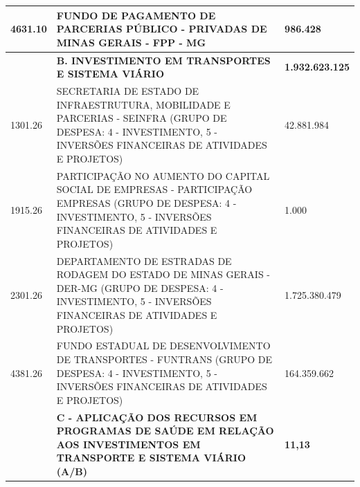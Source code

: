 \documentclass{article}
\begin{document}
\begin{longtable}[c]{m{3cm}|m{12cm}|m{3cm}}
\multicolumn{1}{C{3cm}|}{4631.10} & \multicolumn{1}{L{12cm}|}{FUNDO DE PAGAMENTO DE PARCERIAS PÚBLICO - PRIVADAS DE MINAS GERAIS - FPP - MG} & \multicolumn{1}{R{3cm}}{986.428} \\
\hline
\multicolumn{1}{C{3cm}|}{ \textbf{}} & \multicolumn{1}{L{12cm}|}{ \textbf{B. INVESTIMENTO EM TRANSPORTES E SISTEMA VIÁRIO}} & \multicolumn{1}{R{3cm}}{ \textbf{1.932.623.125}} \\
\multicolumn{1}{C{3cm}|}{1301.26} & \multicolumn{1}{L{12cm}|}{SECRETARIA DE ESTADO DE INFRAESTRUTURA, MOBILIDADE E PARCERIAS - SEINFRA (GRUPO DE DESPESA: 4 - INVESTIMENTO, 5 - INVERSÕES FINANCEIRAS DE ATIVIDADES E PROJETOS)} & \multicolumn{1}{R{3cm}}{42.881.984} \\
\multicolumn{1}{C{3cm}|}{1915.26} & \multicolumn{1}{L{12cm}|}{PARTICIPAÇÃO NO AUMENTO DO CAPITAL SOCIAL DE EMPRESAS - PARTICIPAÇÃO EMPRESAS (GRUPO DE DESPESA: 4 - INVESTIMENTO, 5 - INVERSÕES FINANCEIRAS DE ATIVIDADES E PROJETOS)} & \multicolumn{1}{R{3cm}}{1.000} \\
\multicolumn{1}{C{3cm}|}{2301.26} & \multicolumn{1}{L{12cm}|}{DEPARTAMENTO DE ESTRADAS DE RODAGEM DO ESTADO DE MINAS GERAIS - DER-MG (GRUPO DE DESPESA: 4 - INVESTIMENTO, 5 - INVERSÕES FINANCEIRAS DE ATIVIDADES E PROJETOS)} & \multicolumn{1}{R{3cm}}{1.725.380.479} \\
\multicolumn{1}{C{3cm}|}{4381.26} & \multicolumn{1}{L{12cm}|}{FUNDO ESTADUAL DE DESENVOLVIMENTO DE TRANSPORTES - FUNTRANS (GRUPO DE DESPESA: 4 - INVESTIMENTO, 5 - INVERSÕES FINANCEIRAS DE ATIVIDADES E PROJETOS)} & \multicolumn{1}{R{3cm}}{164.359.662} \\
\hline
\multicolumn{1}{C{3cm}|}{ \textbf{}} & \multicolumn{1}{L{12cm}|}{ \textbf{C - APLICAÇÃO DOS RECURSOS EM PROGRAMAS DE SAÚDE EM RELAÇÃO AOS INVESTIMENTOS EM TRANSPORTE E SISTEMA VIÁRIO (A/B)}} & \multicolumn{1}{R{3cm}}{ \textbf{11,13}} \\\hline\hline\end{longtable}\raggedright\fontsize{7pt}{10pt}\selectfont {Fonte: PPO.} \\\fontsize{7pt}{10pt}\selectfont {ELABORAÇÃO: DCAF/SCPPO/SEPLAG}\\\fontsize{7pt}{10pt}\\
\end{document}
